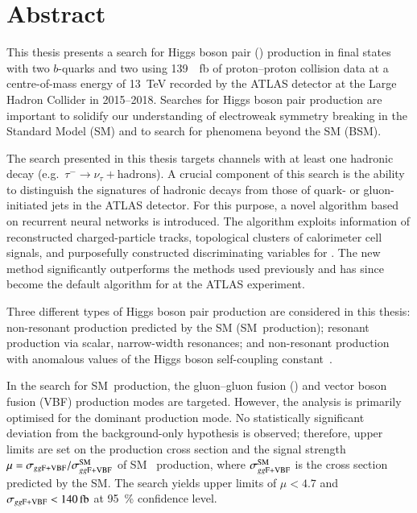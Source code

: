 \chapter*{Abstract}


This thesis presents a search for Higgs boson pair (\HH) production in final
states with two $b$-quarks and two \tauleptons using \SI{139}{\per\femto\barn}
of proton--proton collision data at a centre-of-mass energy of \SI{13}{\TeV}
recorded by the ATLAS detector at the Large Hadron Collider in 2015--2018.
Searches for Higgs boson pair production are important to solidify our
understanding of electroweak symmetry breaking in the Standard Model (SM) and to
search for phenomena beyond the SM (BSM).

The search presented in this thesis targets channels with at least one hadronic
\taulepton decay (e.g.~$\tau^{-} \to \nu_{\tau} + \text{hadrons}$). A crucial
component of this search is the ability to distinguish the signatures of
hadronic \taulepton decays from those of quark- or gluon-initiated jets in the
ATLAS detector. For this purpose, a novel \tauid algorithm based on recurrent
neural networks is introduced. The algorithm exploits information of
reconstructed charged-particle tracks, topological clusters of calorimeter cell
signals, and purposefully constructed discriminating variables for \tauid. The
new \tauid method significantly outperforms the methods used previously and has
since become the default algorithm for \tauid at the ATLAS experiment.

Three different types of Higgs boson pair production are considered in this
thesis: non-resonant \HH production predicted by the SM (SM~\HH production);
resonant \HH production via scalar, narrow-width resonances; and non-resonant
\HH production with anomalous values of the Higgs boson self-coupling
constant~\lambdahhh.

In the search for SM~\HH production, the gluon--gluon fusion (\ggF) and vector
boson fusion (VBF) production modes are targeted. However, the analysis is
primarily optimised for the dominant \ggF production mode. No statistically
significant deviation from the background-only hypothesis is observed;
therefore, upper limits are set on the production cross section \xsecggfvbf and
the signal strength~$\mu = \sigma_{gg\text{F+VBF}} / \sigma_{gg\text{F+VBF}}^{\text{SM}}$ of SM~\HH
production, where $\sigma_{gg\text{F+VBF}}^{\text{SM}}$ is the cross section predicted by
the SM. The search yields upper limits of $\mu < \num{4.7}$ and
$\xsecggfvbf < \SI{140}{\femto\barn}$ at \SI{95}{\percent} confidence level.

